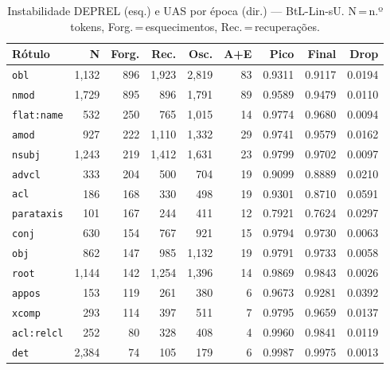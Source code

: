 

\begin{table}[ht]
\centering
\caption{Instabilidade DEPREL (esq.) e UAS por época (dir.) --- BtL-Lin-sU. N\,=\,n.º tokens, Forg.\,=\,esquecimentos, Rec.\,=\,recuperações.}
\label{tab:inst-bert-large-portuguese-cased-predictions-ablacao-linear}
\begin{minipage}[t]{0.54\linewidth}
\centering\tiny
\begin{tabular}{lrrrrrrrr}
\toprule
\textbf{Rótulo} & \textbf{N} & \textbf{Forg.} & \textbf{Rec.} & \textbf{Osc.} & \textbf{A+E} & \textbf{Pico} & \textbf{Final} & \textbf{Drop} \\
\midrule
\texttt{obl} & 1,132 & 896 & 1,923 & 2,819 & 83 & 0.9311 & 0.9117 & 0.0194 \\
\texttt{nmod} & 1,729 & 895 & 896 & 1,791 & 89 & 0.9589 & 0.9479 & 0.0110 \\
\texttt{flat\!:\!name} & 532 & 250 & 765 & 1,015 & 14 & 0.9774 & 0.9680 & 0.0094 \\
\texttt{amod} & 927 & 222 & 1,110 & 1,332 & 29 & 0.9741 & 0.9579 & 0.0162 \\
\texttt{nsubj} & 1,243 & 219 & 1,412 & 1,631 & 23 & 0.9799 & 0.9702 & 0.0097 \\
\texttt{advcl} & 333 & 204 & 500 & 704 & 19 & 0.9099 & 0.8889 & 0.0210 \\
\texttt{acl} & 186 & 168 & 330 & 498 & 19 & 0.9301 & 0.8710 & 0.0591 \\
\texttt{parataxis} & 101 & 167 & 244 & 411 & 12 & 0.7921 & 0.7624 & 0.0297 \\
\texttt{conj} & 630 & 154 & 767 & 921 & 15 & 0.9794 & 0.9730 & 0.0063 \\
\texttt{obj} & 862 & 147 & 985 & 1,132 & 19 & 0.9791 & 0.9733 & 0.0058 \\
\texttt{root} & 1,144 & 142 & 1,254 & 1,396 & 14 & 0.9869 & 0.9843 & 0.0026 \\
\texttt{appos} & 153 & 119 & 261 & 380 & 6 & 0.9673 & 0.9281 & 0.0392 \\
\texttt{xcomp} & 293 & 114 & 397 & 511 & 7 & 0.9795 & 0.9659 & 0.0137 \\
\texttt{acl\!:\!relcl} & 252 & 80 & 328 & 408 & 4 & 0.9960 & 0.9841 & 0.0119 \\
\texttt{det} & 2,384 & 74 & 105 & 179 & 6 & 0.9987 & 0.9975 & 0.0013 \\
\bottomrule
\end{tabular}
\end{minipage}

\end{table}
